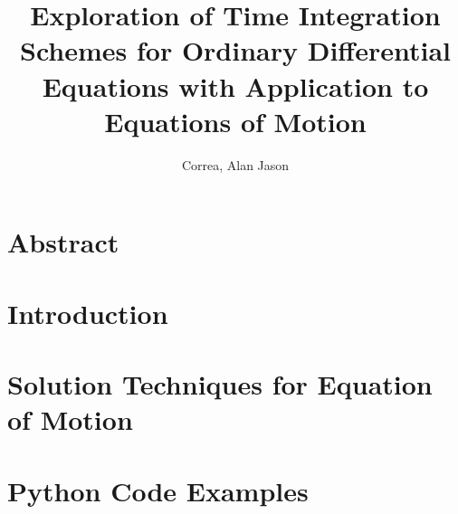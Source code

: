 \documentclass[12pt, twoside]{scrreprt}
\title{
	{Exploration of Time Integration Schemes for Ordinary Differential Equations with Application to Equations of Motion}\\
}
\author{Correa, Alan Jason}
\date{}
\begin{document}
\maketitle

\chapter*{Abstract}






\tableofcontents

\chapter{Introduction}\label{ch1}


\chapter{Solution Techniques for Equation of Motion}\label{ch2}


%

\appendix
\chapter{Python Code Examples}


\setcounter{biburllcpenalty}{7000}


\printbibliography
\end{document}
